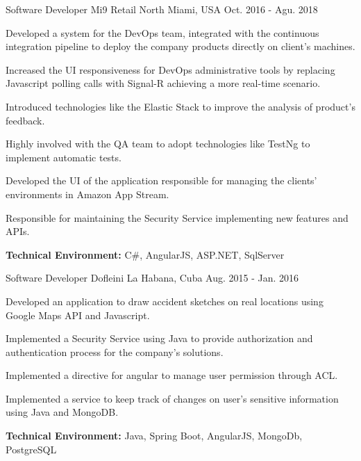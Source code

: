 \begin{cventries}
\workexperienceentry
{Software Developer} %
{Mi9 Retail} %
{North Miami, USA} %
{Oct. 2016 - Agu. 2018} %
{ %
\begin{cvitems}
    \item {Developed a system for the DevOps team, integrated with the continuous integration pipeline to deploy the company products directly on client's machines.}
    \item {Increased the UI responsiveness for DevOps administrative tools by replacing Javascript polling calls with Signal-R achieving a more real-time scenario.}
    \item {Introduced technologies like the Elastic Stack to improve the analysis of  product's feedback.}  
    \item {Highly involved with the QA team to adopt technologies like TestNg to implement automatic tests.}
    \item {Developed the UI of the application responsible for managing the clients' environments in Amazon App Stream.}
    \item {Responsible for maintaining the Security Service implementing new features and APIs.}
\end{cvitems}
}
{\textbf{Technical Environment:} C\#, AngularJS, ASP.NET, SqlServer}


\workexperienceentry
{Software Developer} %
{Dofleini} %
{La Habana, Cuba} %
{Aug. 2015 - Jan. 2016} %
{ %
\begin{cvitems}
	\item {Developed an application to draw accident sketches on real locations using Google Maps API and
		Javascript.}
	\item {Implemented a Security Service using Java to provide authorization and authentication
	process for the company's solutions.}
	\item {Implemented a directive for angular to manage user permission through ACL.}
	\item {Implemented a service to keep track of changes on user's sensitive information using Java and MongoDB.}
\end{cvitems}
}
{\textbf{Technical Environment:} Java, Spring Boot, AngularJS, MongoDb, PostgreSQL}




\end{cventries}
